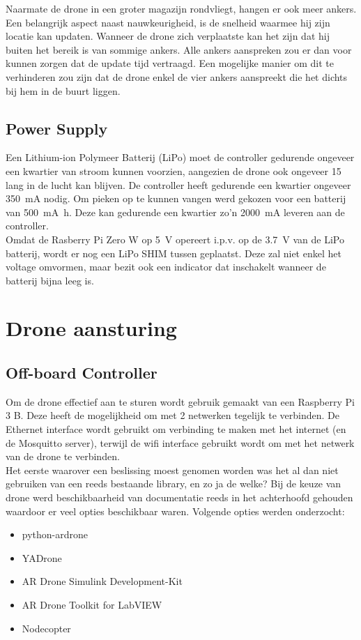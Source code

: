 Naarmate de drone in een groter magazijn rondvliegt, hangen er ook meer ankers.
Een belangrijk aspect naast nauwkeurigheid, is de snelheid waarmee hij zijn locatie kan updaten.
Wanneer de drone zich verplaatste kan het zijn dat hij buiten het bereik is van sommige ankers.
Alle ankers aanspreken zou er dan voor kunnen zorgen dat de update tijd vertraagd.
Een mogelijke manier om dit te verhinderen zou zijn dat de drone enkel de vier ankers aanspreekt die het dichts bij hem in de buurt liggen.

\subsection{Power Supply} \label{sec:power_supply}
Een Lithium-ion Polymeer Batterij (LiPo) moet de controller gedurende ongeveer een kwartier van stroom kunnen voorzien, aangezien de drone ook ongeveer \SI{15}{\min} lang in de lucht kan blijven.
De controller heeft gedurende een kwartier ongeveer \SI{350}{\mA} nodig.
Om pieken op te kunnen vangen werd gekozen voor een batterij van \SI{500}{\mA\hour}. Deze kan gedurende een kwartier zo'n \SI{2000}{\mA} leveren aan de controller.\\

Omdat de Rasberry Pi Zero W op \SI{5}{\V} opereert i.p.v. op de \SI{3.7}{\V} van de LiPo batterij, wordt er nog een LiPo SHIM tussen geplaatst.
Deze zal niet enkel het voltage omvormen, maar bezit ook een indicator dat inschakelt wanneer de batterij bijna leeg is.

\section{Drone aansturing} \label{sec:drone_control}
\subsection{Off-board Controller} \label{sec:offboard_controller}
Om de drone effectief aan te sturen wordt gebruik gemaakt van een Raspberry Pi 3 B.
Deze heeft de mogelijkheid om met 2 netwerken tegelijk te verbinden.
De Ethernet interface wordt gebruikt om verbinding te maken met het internet (en de Mosquitto server), terwijl de wifi interface gebruikt wordt om met het netwerk van de drone te verbinden.\\

Het eerste waarover een beslissing moest genomen worden was het al dan niet gebruiken van een reeds bestaande library, en zo ja de welke?
Bij de keuze van drone werd beschikbaarheid van documentatie reeds in het achterhoofd gehouden waardoor er veel opties beschikbaar waren.
Volgende opties werden onderzocht:
\begin{itemize}
\item python-ardrone
\item YADrone
\item AR Drone Simulink Development-Kit
\item AR Drone Toolkit for LabVIEW
\item Nodecopter
\end{itemize}

